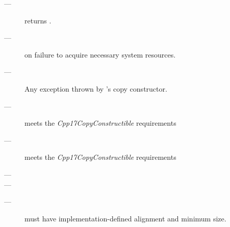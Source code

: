 \postcond
\begin{description}
    \item[---] \emptyfn returns \false.
\end{description}

\except
\begin{description}
    \item[---]  on failure to acquire necessary system
               resources.
    \item[---] Any exception thrown by 's copy constructor.
\end{description}


\mandates
\begin{description}
    \item[---]  meets the \emph{Cpp17CopyConstructible} requirements
    \item[---]  meets the \emph{Cpp17CopyConstructible} requirements
    \item[---] 
    \item[---] 
\end{description}

\precond
\begin{description}
    \item[---]  must have implementation-defined alignment and minimum size.
\end{description}

